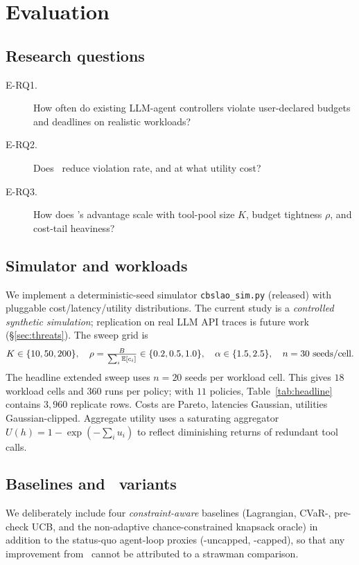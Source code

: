 \section{Evaluation}
\label{sec:evaluation}

\subsection{Research questions}
\begin{description}
  \item[E-RQ1.] How often do existing LLM-agent controllers violate
    user-declared budgets and deadlines on realistic workloads?
  \item[E-RQ2.] Does \CBUC~reduce violation rate, and at what utility
    cost?
  \item[E-RQ3.] How does \CBUC's advantage scale with tool-pool size
    $K$, budget tightness $\rho$, and cost-tail heaviness?
\end{description}

\subsection{Simulator and workloads}
We implement a deterministic-seed simulator \texttt{cbslao\_sim.py}
(released) with pluggable cost/latency/utility distributions. The
current study is a \emph{controlled synthetic simulation}; replication
on real LLM API traces is future work
(\S\ref{sec:threats}). The sweep grid is
\[
  K \in \{10, 50, 200\},\quad
  \rho = \tfrac{B}{\sum_i \mathbb{E}[c_i]}
      \in \{0.2, 0.5, 1.0\},\quad
  \alpha \in \{1.5, 2.5\},\quad
  n = 30\text{ seeds/cell}.
\]
The headline extended sweep uses $n=20$ seeds per workload cell. This
gives $18$ workload cells and $360$ runs per policy; with $11$
policies, Table~\ref{tab:headline} contains $3{,}960$ replicate rows.
Costs are Pareto, latencies Gaussian, utilities Gaussian-clipped.
Aggregate utility uses a saturating aggregator
$U(h) = 1 - \exp(-\sum_i u_i)$ to reflect diminishing returns of
redundant tool calls.

\subsection{Baselines and \CBUC~variants}
We deliberately include four \emph{constraint-aware} baselines
(Lagrangian, CVaR-\BwK, pre-check UCB, and the non-adaptive
chance-constrained knapsack oracle) in addition to the status-quo
agent-loop proxies (\ReAct-uncapped, \ReAct-capped), so that any
improvement from \CBUC~cannot be attributed to a strawman comparison.


